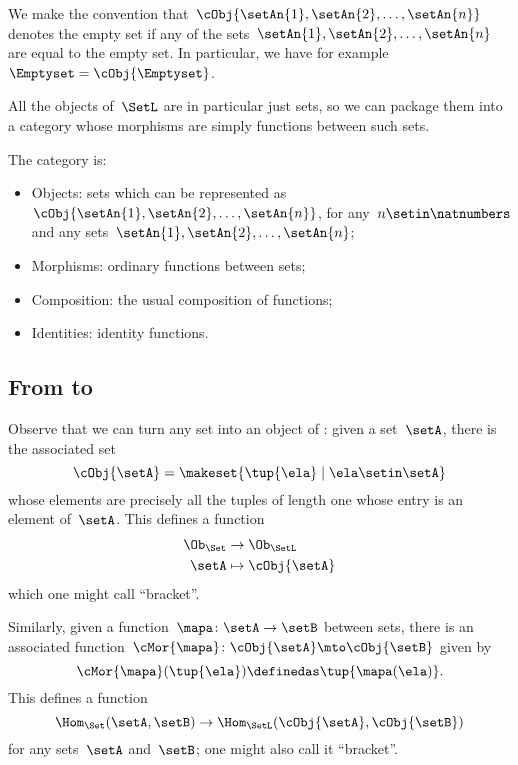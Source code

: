 We make the convention that~$\cObj{\setAn{1}, \setAn{2}, \ldots, \setAn{n}}$ denotes the empty set if any of the sets~$\setAn{1}, \setAn{2}, \ldots , \setAn{n}$ are equal to the empty set.
In particular, we have for example~$\Emptyset = \cObj{\Emptyset}$.

All the objects of~$\SetL$ are in particular just sets, so we can package them into a category whose morphisms are simply functions between such sets.

\begin{ctdefinition}[\SetL]
    The category \SetL is:
    \begin{itemize}
        \item Objects: sets which can be represented as~$\cObj{\setAn{1}, \setAn{2}, \ldots, \setAn{n}}$, for any~$n \setin \natnumbers$ and any sets~$\setAn{1}, \setAn{2}, \ldots, \setAn{n}$;
        \item Morphisms: ordinary functions between sets;
        \item Composition: the usual composition of functions;
        \item Identities: identity functions.
    \end{itemize}
\end{ctdefinition}

\subsection{From \Set to~\SetL}

Observe that we can turn any set into an object of \SetL: given a set~$\setA$, there is the associated set
\begin{equation}
    \cObj{\setA} = \makeset{ \tup{\ela} \mid \ela \setin \setA }
\end{equation}
whose elements are precisely all the tuples of length one whose entry is an element of~$\setA$.
This defines a function
\begin{equation}
    \begin{aligned}
        \Ob_{\Set} & \to \Ob_{\SetL} \\
        \setA      & \mapsto \cObj{\setA}
    \end{aligned}
\end{equation}
which one might call ``bracket''.

Similarly, given a function~$\mapa \colon \setA \to \setB$ between sets, there is an associated function~$\cMor{ \mapa }\colon \cObj{\setA} \mto \cObj{\setB}$ given by
\begin{equation}
    \cMor{ \mapa } ( \tup{ \ela }) \definedas \tup{\mapa(\ela)}.
\end{equation}
This defines a function
\begin{equation}
    \Hom_{\Set}(\setA,\setB) \to \Hom_{\SetL}(\cObj{\setA},\cObj{\setB})
\end{equation}
for any sets~$\setA$ and~$\setB$; one might also call it ``bracket''.

